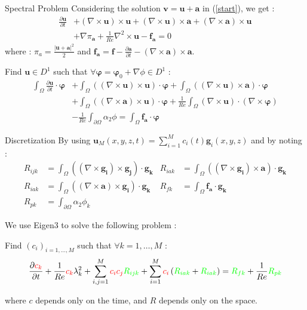\documentclass{beamer}
\newcommand{\grad}{{\nabla}}
\newcommand{\curl}{{\nabla\times}}
\newcommand{\curll}{{\nabla^2\times}}
\begin{document}
\begin{frame}{Spectral Problem}
  Considering the solution $\mathbf{v}=\mathbf{u}+\mathbf{a}$ in (\ref{start}), we get :
  \begin{align*}
    \frac{\partial \mathbf{u}}{\partial t} &+ (\curl \mathbf{u})\times \mathbf{u} + (\curl \mathbf{u})\times \mathbf{a} + \left(\curl \mathbf{a}\right)\times \mathbf{u} \\
    &+ \grad\pi_\mathbf{a} + \frac{1}{Re}\curll \mathbf{u} - \mathbf{f_a} = 0
  \end{align*}
  where : $\pi_a=\frac{|\mathbf{u}+\mathbf{a}|^2}{2}$ and $\mathbf{f_a}=\mathbf{f}-\frac{\partial \mathbf{a}}{\partial t}-(\curl\mathbf{a})\times\mathbf{a}$.
  \begin{block}{Find $\mathbf{u}\in D^1$ such that $\forall \bm{\varphi}=\bm{\varphi}_0+\grad\phi\in D^1$ :}
    \begin{align*}
      \int_\Omega \frac{\partial \mathbf{u}}{\partial t}\cdot \bm{\varphi} &+ \int_\Omega ((\curl \mathbf{u})\times \mathbf{u})\cdot \bm{\varphi} + \int_\Omega ((\curl \mathbf{u})\times \mathbf{a})\cdot\bm{\varphi} \\
      &+ \int_\Omega ((\curl \mathbf{a})\times \mathbf{u})\cdot\bm{\varphi} + \frac{1}{Re}\int_\Omega (\curl \mathbf{u})\cdot(\curl\bm{\varphi}) \\
      &-\frac{1}{Re}\int_{\partial\Omega} \alpha_2\phi = \int_\Omega \mathbf{f_a}\cdot\bm{\varphi}
    \end{align*}
  \end{block}
\end{frame}

\begin{frame}{Discretization}
  By using $\mathbf{u}_M(x,y,z,t)=\sum_{i=1}^M c_i(t)\mathbf{g}_i(x,y,z)$ and by noting :
  \begin{align*}
    R_{ijk} &= \int_\Omega((\curl\mathbf{g_i})\times \mathbf{g_j})\cdot\mathbf{g_k} & R_{iak} &= \int_\Omega((\curl\mathbf{g_i})\times \mathbf{a})\cdot\mathbf{g_k}\\
    R_{iak} &= \int_\Omega((\curl\mathbf{a})\times \mathbf{g_i})\cdot\mathbf{g_k} & R_{fk} &= \int_\Omega\mathbf{f_a}\cdot\mathbf{g_k}\\
    R_{pk} &= \int_{\partial\Omega} \alpha_2\phi_k
  \end{align*}

  We use Eigen3 to solve the following problem :
  \begin{block}{Find $(c_i)_{i=1,\dots,M}$ such that $\forall k=1,\dots,M$ :}
    \[ \frac{\partial {\color{red}c_k}}{\partial t} + \frac{1}{Re}{\color{red}c_k}\lambda_k^2 + \sum_{i,j=1}^M{\color{red}c_ic_j}{\color{green}R_{ijk}} + \sum_{i=1}^M{\color{red}c_i}\left({\color{green}R_{iak}} + {\color{green}R_{iak}}\right) = {\color{green}R_{fk}} + \frac{1}{Re}{\color{green}R_{pk}} \]
  \end{block}
  where {\color{red} $c$} depends only on the time, and {\color{green} $R$} depends only on the space.
\end{frame}
\end{document}

